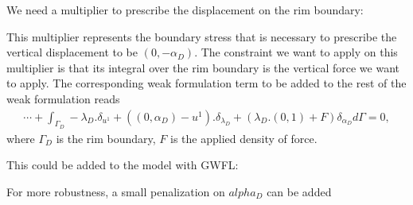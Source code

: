 \documentclass[a4paper,11pt,english]{sphinxmanual}
\begin{document}
We need a multiplier to prescribe the displacement on the rim boundary:

\begin{sphinxVerbatim}[commandchars=\\\{\}]
  
\end{sphinxVerbatim}

This multiplier represents the boundary stress that is necessary to prescribe the vertical displacement to be \((0, -\alpha_D)\). The constraint we want to apply on this multiplier is that its integral over the rim boundary is the vertical force we want to apply. The corresponding weak formulation term to be added to the rest of the weak formulation reads
\begin{equation*}
\begin{split}\cdots + \int_{\Gamma_D} -\lambda_D.\delta_{u^1} + ((0, \alpha_D) - u^1).\delta_{\lambda_D} + (\lambda_D.(0,1) + F)\delta_{\alpha_D} d\Gamma = 0,\end{split}
\end{equation*}
where \(\Gamma_D\) is the rim boundary, \(F\) is the applied density of force.

This could be added to the model with GWFL:

\begin{sphinxVerbatim}[commandchars=\\\{\}]
 \PYG{p}{[}\PYG{p}{]}
 
       
\end{sphinxVerbatim}

For more robustness, a small penalization on \(alpha_D\) can be added
\end{document}
